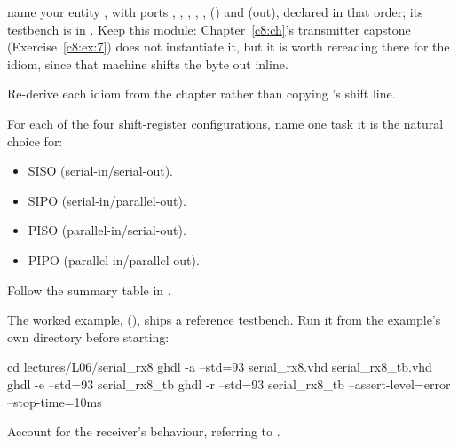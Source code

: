 
\selfcheck name your entity , with ports , , ,
, ,  () and
 (out), declared in that order; its testbench is in . Keep
this module: Chapter~\ref{c8:ch}'s transmitter capstone (Exercise~\ref{c8:ex:7}) does not
instantiate it, but it is worth rereading there for the idiom, since that machine shifts the byte
out inline.

Re-derive each idiom from the chapter rather than copying 's shift line.

\begin{parts}\setcounter{enumi}{2}
  \item For each of the four shift-register configurations, name one task it is the natural choice
    for:
    \begin{itemize}
      \item SISO (serial-in/serial-out).
      \item SIPO (serial-in/parallel-out).
      \item PISO (parallel-in/serial-out).
      \item PIPO (parallel-in/parallel-out).
    \end{itemize}
    Follow the summary table in .
\end{parts}

\label{c6:set:3}

The worked example,  (), ships a
reference testbench. Run it from the example's own directory before starting:

\begin{shell}
cd lectures/L06/serial_rx8
ghdl -a --std=93 serial_rx8.vhd serial_rx8_tb.vhd
ghdl -e --std=93 serial_rx8_tb
ghdl -r --std=93 serial_rx8_tb --assert-level=error --stop-time=10ms
\end{shell}

\label{c6:ex:8}
Account for the receiver's behaviour, referring to .


